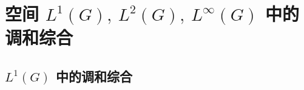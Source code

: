 \chapter{空间 \texorpdfstring{$L^{1}(G),\ L^{2}(G),\ L^{\infty}(G)$}{L1(G), L2(G), Linf(G)} 中的调和综合}
\section{\texorpdfstring{$L^{1}(G)$}{L1(G)} 中的调和综合}
